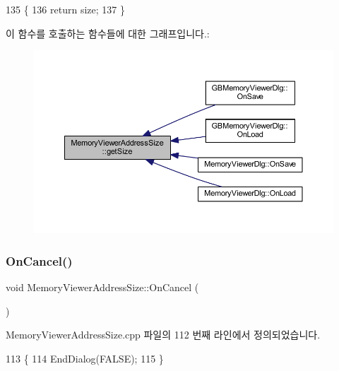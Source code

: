 \begin{DoxyCode}
135 \{
136   \textcolor{keywordflow}{return} size;
137 \}
\end{DoxyCode}
이 함수를 호출하는 함수들에 대한 그래프입니다.\+:
\nopagebreak
\begin{figure}[H]
\begin{center}
\leavevmode
\includegraphics[width=350pt]{class_memory_viewer_address_size_ade3cfceb89cd35954e57d10dba882eb1_icgraph}
\end{center}
\end{figure}
\mbox{\label{class_memory_viewer_address_size_af05210504fe10d13c328d7d953da28d8}} 
\subsubsection{\texorpdfstring{On\+Cancel()}{OnCancel()}}
{\footnotesize\ttfamily void Memory\+Viewer\+Address\+Size\+::\+On\+Cancel (\begin{DoxyParamCaption}{ }\end{DoxyParamCaption})\hspace{0.3cm}{\ttfamily [protected]}}



Memory\+Viewer\+Address\+Size.\+cpp 파일의 112 번째 라인에서 정의되었습니다.


\begin{DoxyCode}
113 \{
114   EndDialog(FALSE);
115 \}
\end{DoxyCode}
\mbox{\label{class_memory_viewer_address_size_a986a62d4477f5c2b6d227386803a6b5e}} 
